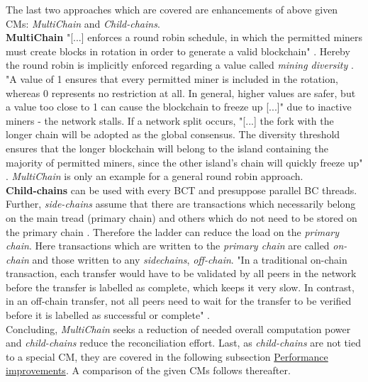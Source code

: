 \noindent The last two approaches which are covered are enhancements of above given \gls{CM}s: \textit{MultiChain} and \textit{Child-chains}. \\
\textbf{MultiChain} "[...] enforces a round robin schedule, in which the permitted miners must create blocks in rotation
in order to generate a valid blockchain" \cite[7]{Greenspan.2015}. \label{def:MultiChain}
Hereby the round robin is implicitly enforced regarding a value called \textit{mining diversity} \cite[7]{Greenspan.2015}.
"A value of 1 ensures that every permitted miner is included in the rotation, whereas 0
represents no restriction at all. In general, higher values are safer, but a value too close to 1 can
cause the blockchain to freeze up [...]"
\cite[7]{Greenspan.2015} due to inactive miners - the network stalls.
If a network split occurs, "[...] the fork with the longer chain will be adopted as the global consensus.
The diversity threshold ensures that the longer blockchain will belong to the island
containing the majority of permitted miners, since the other island’s chain will quickly freeze up"
\cite[8]{Greenspan.2015}.
\textit{MultiChain} is only an example for a general round robin approach. \\
\textbf{Child-chains} can be used with every \gls{BCT} and presuppose parallel \gls{BC} threads.
Further, \textit{side-chains} assume that there are transactions which necessarily belong on the main
tread (primary chain) and others which do not need to be stored on the primary chain \cite[1206]{Kim.2018}.
Therefore the ladder can reduce the load on the \textit{primary chain}.
Here transactions which are written to the \textit{primary chain} are called \textit{on-chain} and those written to any \textit{sidechains}, \textit{off-chain}.
"In a traditional on-chain transaction, each transfer would have to be validated by all peers in the network before the transfer is labelled as complete, which keeps it very slow.
In contrast, in an off-chain transfer, not all peers need to wait for the transfer to be verified before it is labelled as successful or complete" 
\cite[15]{Sharma.2020}. \\
Concluding, \textit{MultiChain} seeks a reduction of needed overall computation power and \textit{child-chains} reduce the reconciliation effort.
Last, as \textit{child-chains} are not tied to a special \gls{CM}, they are covered in the following subsection \hyperref[sec:PerformanceImprovements]{Performance improvements}.
A comparison of the given \gls{CM}s follows thereafter.



